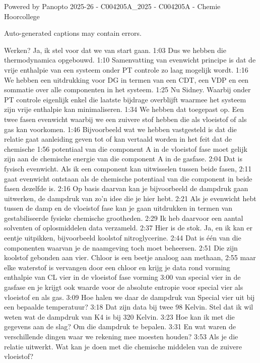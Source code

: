 
 	
Powered by Panopto
2025-26 - C004205A_2025 - C004205A - Chemie
Hoorcollege

Auto-generated captions may contain errors.

Werken? Ja, ik stel voor dat we van start gaan.
1:03
Dus we hebben die thermodynamica opgebouwd.
1:10
Samenvatting van evenwicht principe is dat de vrije enthalpie van een systeem onder PT controle zo laag mogelijk wordt.
1:16
We hebben een uitdrukking voor DG in termen van een CDT, een VDP en een sommatie over alle componenten in het systeem.
1:25
Nu Sidney. Waarbij onder PT controle eigenlijk enkel die laatste bijdrage overblijft waarmee het systeem zijn vrije enthalpie kan minimaliseren.
1:34
We hebben dat toegepast op. Een twee fasen evenwicht waarbij we een zuivere stof hebben die als vloeistof of als gas kan voorkomen.
1:46
Bijvoorbeeld wat we hebben vastgesteld is dat die relatie gaat aanleiding geven tot of kan vertaald worden in het feit dat de chemische
1:56
potentiaal van die component A in de vloeistof fase moet gelijk zijn aan de chemische energie van die component A in de gasfase.
2:04
Dat is fysisch evenwicht. Als ik een component kan uitwisselen tussen beide fasen,
2:11
gaat evenwicht ontstaan als de chemische potentiaal van die component in beide fasen dezelfde is.
2:16
Op basis daarvan kan je bijvoorbeeld de dampdruk gaan uitwerken, de dampdruk van zo'n idee die je hier hebt.
2:21
Als je evenwicht hebt tussen de damp en de vloeistof fase kan je gaan uitdrukken in termen van gestabiliseerde fysieke chemische grootheden.
2:29
Ik heb daarvoor een aantal solventen of oplosmiddelen data verzameld.
2:37
Hier is de stok. Ja, en ik kan er eentje uitpikken, bijvoorbeeld koolstof nitroglycerine.
2:44
Dat is één van die componenten waarvan je de naamgeving toch moet beheersen.
2:51
Die zijn koolstof gebonden aan vier. Chloor is een beetje analoog aan methaan,
2:55
maar elke waterstof is vervangen door een chloor en krijg je data rond vorming enthalpie van CL vier in de vloeistof fase vorming
3:00
van special vier in de gasfase en je krijgt ook waarde voor de absolute entropie voor special vier als vloeistof en als gas.
3:09
Hoe halen we daar de dampdruk van Special vier uit bij een bepaalde temperatuur?
3:18
Dat zijn data bij twee 98 Kelvin. Stel dat ik wil weten wat de dampdruk van K4 is bij 320 Kelvin.
3:23
Hoe kan ik met die gegevens aan de slag? Om die dampdruk te bepalen.
3:31
En wat waren de verschillende dingen waar we rekening mee moesten houden?
3:53
Als je die relatie uitwerkt. Wat kan je doen met die chemische middelen van de zuivere vloeistof?
